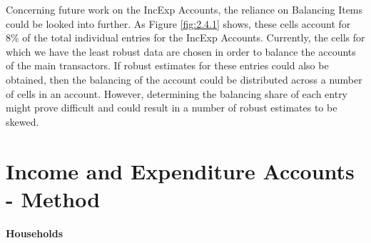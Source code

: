 Concerning future work on the IncExp Accounts, the reliance on Balancing Items could be looked into further. As Figure \ref{fig:2.4.1} shows, these cells account for 8\% of the total individual entries for the IncExp Accounts. Currently, the cells for which we have the least robust data are chosen in order to balance the accounts of the main transactors. If robust estimates for these entries could also be obtained, then the balancing of the account could be distributed across a number of cells in an account. However, determining the balancing share of each entry might prove difficult and could result in a number of robust estimates to be skewed.

\newpage


\newpage
\section{Income and Expenditure Accounts - Method}
\label{sec:2.5}

\bigskip
\begin{center}
\textbf{\LARGE Households}
\end{center}

